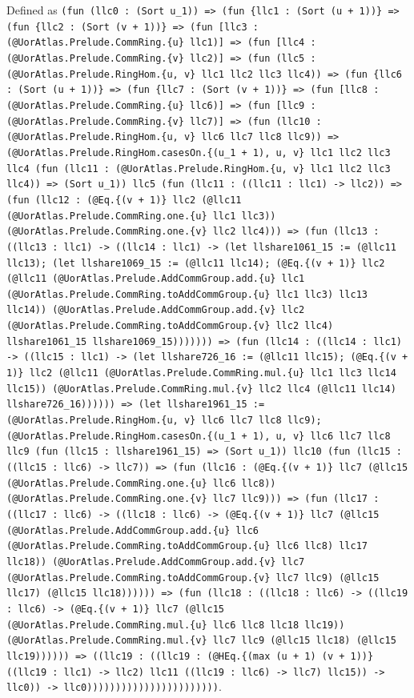 \documentclass[11pt]{article}
\begin{document}
\noindent Defined as \texttt{(fun (llc0 : (Sort u\_1)) => (fun \{llc1 : (Sort (u + 1))\} => (fun \{llc2 : (Sort (v + 1))\} => (fun [llc3 : (@UorAtlas.Prelude.CommRing.\{u\} llc1)] => (fun [llc4 : (@UorAtlas.Prelude.CommRing.\{v\} llc2)] => (fun (llc5 : (@UorAtlas.Prelude.RingHom.\{u, v\} llc1 llc2 llc3 llc4)) => (fun \{llc6 : (Sort (u + 1))\} => (fun \{llc7 : (Sort (v + 1))\} => (fun [llc8 : (@UorAtlas.Prelude.CommRing.\{u\} llc6)] => (fun [llc9 : (@UorAtlas.Prelude.CommRing.\{v\} llc7)] => (fun (llc10 : (@UorAtlas.Prelude.RingHom.\{u, v\} llc6 llc7 llc8 llc9)) => (@UorAtlas.Prelude.RingHom.casesOn.\{(u\_1 + 1), u, v\} llc1 llc2 llc3 llc4 (fun (llc11 : (@UorAtlas.Prelude.RingHom.\{u, v\} llc1 llc2 llc3 llc4)) => (Sort u\_1)) llc5 (fun (llc11 : ((llc11 : llc1) -> llc2)) => (fun (llc12 : (@Eq.\{(v + 1)\} llc2 (@llc11 (@UorAtlas.Prelude.CommRing.one.\{u\} llc1 llc3)) (@UorAtlas.Prelude.CommRing.one.\{v\} llc2 llc4))) => (fun (llc13 : ((llc13 : llc1) -> ((llc14 : llc1) -> (let llshare1061\_15 := (@llc11 llc13); (let llshare1069\_15 := (@llc11 llc14); (@Eq.\{(v + 1)\} llc2 (@llc11 (@UorAtlas.Prelude.AddCommGroup.add.\{u\} llc1 (@UorAtlas.Prelude.CommRing.toAddCommGroup.\{u\} llc1 llc3) llc13 llc14)) (@UorAtlas.Prelude.AddCommGroup.add.\{v\} llc2 (@UorAtlas.Prelude.CommRing.toAddCommGroup.\{v\} llc2 llc4) llshare1061\_15 llshare1069\_15))))))) => (fun (llc14 : ((llc14 : llc1) -> ((llc15 : llc1) -> (let llshare726\_16 := (@llc11 llc15); (@Eq.\{(v + 1)\} llc2 (@llc11 (@UorAtlas.Prelude.CommRing.mul.\{u\} llc1 llc3 llc14 llc15)) (@UorAtlas.Prelude.CommRing.mul.\{v\} llc2 llc4 (@llc11 llc14) llshare726\_16)))))) => (let llshare1961\_15 := (@UorAtlas.Prelude.RingHom.\{u, v\} llc6 llc7 llc8 llc9); (@UorAtlas.Prelude.RingHom.casesOn.\{(u\_1 + 1), u, v\} llc6 llc7 llc8 llc9 (fun (llc15 : llshare1961\_15) => (Sort u\_1)) llc10 (fun (llc15 : ((llc15 : llc6) -> llc7)) => (fun (llc16 : (@Eq.\{(v + 1)\} llc7 (@llc15 (@UorAtlas.Prelude.CommRing.one.\{u\} llc6 llc8)) (@UorAtlas.Prelude.CommRing.one.\{v\} llc7 llc9))) => (fun (llc17 : ((llc17 : llc6) -> ((llc18 : llc6) -> (@Eq.\{(v + 1)\} llc7 (@llc15 (@UorAtlas.Prelude.AddCommGroup.add.\{u\} llc6 (@UorAtlas.Prelude.CommRing.toAddCommGroup.\{u\} llc6 llc8) llc17 llc18)) (@UorAtlas.Prelude.AddCommGroup.add.\{v\} llc7 (@UorAtlas.Prelude.CommRing.toAddCommGroup.\{v\} llc7 llc9) (@llc15 llc17) (@llc15 llc18)))))) => (fun (llc18 : ((llc18 : llc6) -> ((llc19 : llc6) -> (@Eq.\{(v + 1)\} llc7 (@llc15 (@UorAtlas.Prelude.CommRing.mul.\{u\} llc6 llc8 llc18 llc19)) (@UorAtlas.Prelude.CommRing.mul.\{v\} llc7 llc9 (@llc15 llc18) (@llc15 llc19)))))) => ((llc19 : ((llc19 : (@HEq.\{(max (u + 1) (v + 1))\} ((llc19 : llc1) -> llc2) llc11 ((llc19 : llc6) -> llc7) llc15)) -> llc0)) -> llc0)))))))))))))))))))))))}.\par
\end{document}
